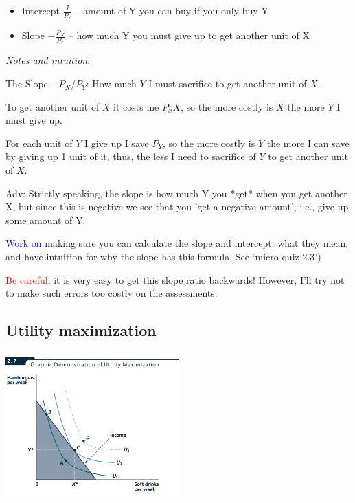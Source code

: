 \documentclass[]{article}
\providecommand{\tightlist}{%
  \setlength{\itemsep}{0pt}\setlength{\parskip}{0pt}}
\begin{document}
\begin{itemize}
\tightlist
\item
  Intercept \(\frac{I}{P_Y}\) -- amount of Y you can buy if you only buy Y
\item
  Slope \(-\frac{P_X}{P_Y}\) -- how much Y you must give up to get another unit of X
\end{itemize}

\medskip

\emph{Notes and intuition}:

The Slope \(-P_X/P_Y\): How much \(Y\) I must sacrifice to get another unit of \(X\).

To get another unit of \(X\) it costs me \(P_xX\), so the more costly is \(X\) the more \(Y\) I must give up.

For each unit of \(Y\) I give up I save \(P_Y\), so the more costly is \(Y\) the more I can save by giving up 1 unit of it,
thus, the less I need to sacrifice of \(Y\) to get another unit of \(X\).

\textcolor{RawSienna}{Adv: Strictly speaking, the slope is how much Y you *get* when you get another X, but since this is negative we see that you 'get a negative amount', i.e., give up some amount of Y.}

\textcolor{blue}{Work on} making sure you can calculate the slope and intercept, what they mean, and have intuition for why the slope has this formula. See `micro quiz 2.3')

\textcolor{red}{Be careful}: it is very easy to get this slope ratio backwards! However, I'll try not to make such errors too costly on the assessments.

\hypertarget{utility-maximization}{%
\subsection{Utility maximization}\label{utility-maximization}}

\includegraphics[height=2.2in]{picsfigs/utilmax.png}
\end{document}
